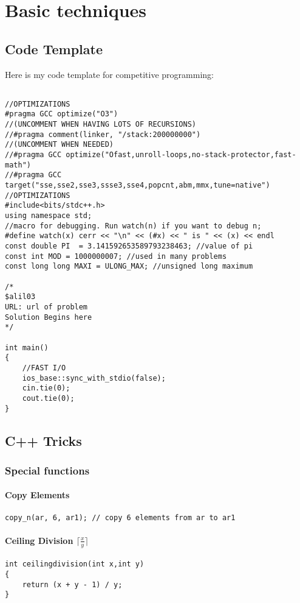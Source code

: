 \documentclass[twoside,12pt,a4paper,english]{book}
\theoremstyle{definition}
\theoremstyle{problemstyle}
\theoremstyle{problemstyle}
\theoremstyle{problemstyle}
\begin{document}
\part{Basic techniques}

\chapter{Code Template}

Here is my code template for competitive programming:

\begin{lstlisting}

//OPTIMIZATIONS
#pragma GCC optimize("O3")
//(UNCOMMENT WHEN HAVING LOTS OF RECURSIONS)
//#pragma comment(linker, "/stack:200000000")
//(UNCOMMENT WHEN NEEDED)
//#pragma GCC optimize("Ofast,unroll-loops,no-stack-protector,fast-math")
//#pragma GCC target("sse,sse2,sse3,ssse3,sse4,popcnt,abm,mmx,tune=native")
//OPTIMIZATIONS
#include<bits/stdc++.h>
using namespace std;
//macro for debugging. Run watch(n) if you want to debug n;
#define watch(x) cerr << "\n" << (#x) << " is " << (x) << endl
const double PI  = 3.141592653589793238463; //value of pi
const int MOD = 1000000007; //used in many problems
const long long MAXI = ULONG_MAX; //unsigned long maximum

/*
$alil03
URL: url of problem
Solution Begins here
*/

int main()
{
    //FAST I/O
	ios_base::sync_with_stdio(false);
	cin.tie(0);
	cout.tie(0);
}
\end{lstlisting}


\chapter{C++ Tricks}

\section{Special functions}
\subsection{Copy Elements}
\begin{lstlisting}
copy_n(ar, 6, ar1); // copy 6 elements from ar to ar1
\end{lstlisting}
\subsection{Ceiling Division \texorpdfstring{$\lceil \frac{x}{y} \rceil$}{}}
\begin{lstlisting}
int ceilingdivision(int x,int y)
{
    return (x + y - 1) / y;
}
\end{lstlisting}
\end{document}
